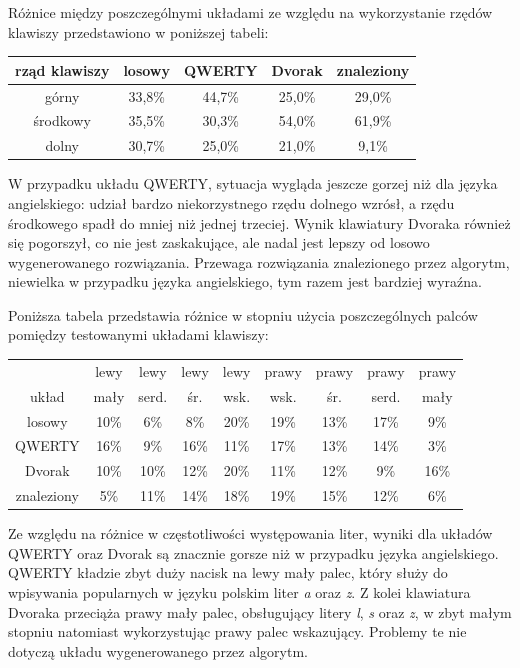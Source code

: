 \documentclass[brudnopis]{xmgr}
\begin{document}
Różnice między poszczególnymi układami ze względu na wykorzystanie rzędów klawiszy przedstawiono w poniższej tabeli:\newline\newline
\begin{tabular}{ c | c | c | c | c}
  rząd klawiszy   & losowy & QWERTY & Dvorak & znaleziony \\
  \hline
  górny           & 33,8\% & 44,7\% & 25,0\% & 29,0\% \\
  środkowy        & 35,5\% & 30,3\% & 54,0\% & 61,9\% \\
  dolny           & 30,7\% & 25,0\% & 21,0\% &  9,1\% \\
\end{tabular}\newline

W przypadku układu QWERTY, sytuacja wygląda jeszcze gorzej niż dla języka angielskiego: udział bardzo niekorzystnego rzędu dolnego wzrósł, a rzędu środkowego spadł do mniej niż jednej trzeciej. Wynik klawiatury Dvoraka również się pogorszył, co nie jest zaskakujące, ale nadal jest lepszy od losowo wygenerowanego rozwiązania. Przewaga rozwiązania znalezionego przez algorytm, niewielka w przypadku języka angielskiego, tym razem jest bardziej wyraźna.

Poniższa tabela przedstawia różnice w stopniu użycia poszczególnych palców pomiędzy testowanymi układami klawiszy:\newline\newline
\begin{tabular}{ c | c | c | c | c | c | c | c | c}
                & lewy & lewy      & lewy     & lewy       & prawy      & prawy    & prawy     & prawy \\
  układ         & mały & serd. & śr. & wsk. & wsk. & śr. & serd. & mały \\
  \hline
  losowy        &  10\% & 6\% & 8\% & 20\% &   19\% & 13\% & 17\% & 9\% \\
  QWERTY        &  16\% & 9\% & 16\% & 11\% &  17\% & 13\% & 14\% & 3\% \\
  Dvorak        &  10\% & 10\% & 12\% & 20\% & 11\% & 12\% & 9\% & 16\% \\
  znaleziony    &  5\% & 11\% & 14\% & 18\% &  19\% & 15\% & 12\% & 6\% \\
\end{tabular}\newline

Ze względu na różnice w częstotliwości występowania liter, wyniki dla układów QWERTY oraz Dvorak są znacznie gorsze niż w przypadku języka angielskiego. QWERTY kładzie zbyt duży nacisk na lewy mały palec, który służy do wpisywania popularnych w języku polskim liter \emph{a} oraz \emph{z}. Z kolei klawiatura Dvoraka przeciąża prawy mały palec, obsługujący litery \emph{l}, \emph{s} oraz \emph{z}, w zbyt małym stopniu natomiast wykorzystując prawy palec wskazujący. Problemy te nie dotyczą układu wygenerowanego przez algorytm.
\end{document}
